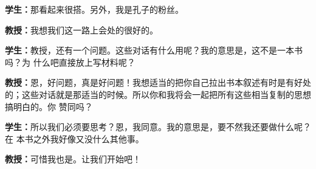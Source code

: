 \begin{mydlg}
	\textbf{学生：}那看起来很搭。另外，我是孔子的粉丝。
	
	\textbf{教授：}我想我们这一路上会处的很好的。
	
	\textbf{学生：}教授，还有一个问题。这些对话有什么用呢？我的意思是，这不是一本书吗？为
	什么吧直接放上写材料呢？
	
	\textbf{教授：}恩，好问题，真是好问题！我想适当的把你自己拉出书本叙述有时是有好处
	的；这些对话就是那适当的时候。所以你和我将会一起把所有这些相当复制的思想搞明白的。你
	赞同吗？
	
	\textbf{学生：}所以我们必须要思考？恩，我同意。我的意思是，要不然我还要做什么呢？在
	本书之外我好像又没什么其他事。
	
	\textbf{教授：}可惜我也是。让我们开始吧！
	
\end{mydlg}

